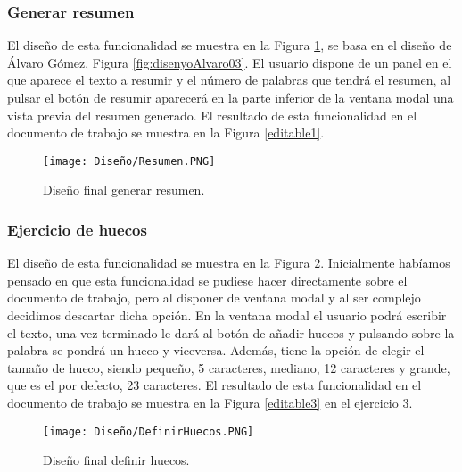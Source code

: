 \subsubsection{Generar resumen}
El diseño de esta funcionalidad se muestra en la Figura \ref{resuemn}, se basa en el diseño de Álvaro Gómez, Figura \ref{fig:disenyoAlvaro03}. El usuario dispone de un panel en el que aparece el texto a resumir y el número de palabras que tendrá el resumen, al pulsar el botón de resumir aparecerá en la parte inferior de la ventana modal una vista previa del resumen generado. El resultado de esta funcionalidad en el documento de trabajo se muestra en la Figura \ref{editable1}.

\begin{figure}[ht!]
  \centering
  \texttt{[image: Diseño/Resumen.PNG]}
  \caption{Diseño final generar resumen.}
  \label{resuemn}
\end{figure}

\subsubsection{Ejercicio de huecos}
El diseño de esta funcionalidad se muestra en la Figura \ref{definir_hueco}. Inicialmente habíamos pensado en que esta funcionalidad se pudiese hacer directamente sobre el documento de trabajo, pero al disponer de ventana modal y al ser complejo decidimos descartar dicha opción. En la ventana modal el usuario podrá escribir el texto, una vez terminado le dará al botón de añadir huecos y pulsando sobre la palabra se pondrá un hueco y viceversa. Además, tiene la opción de elegir el tamaño de hueco, siendo pequeño, 5 caracteres, mediano, 12 caracteres y grande, que es el por defecto, 23 caracteres. El resultado de esta funcionalidad en el documento de trabajo se muestra en la Figura \ref{editable3} en el ejercicio 3. 

\begin{figure}[ht!]
  \centering
  \texttt{[image: Diseño/DefinirHuecos.PNG]}
  \caption{Diseño final definir huecos.}
  \label{definir_hueco}
\end{figure}


